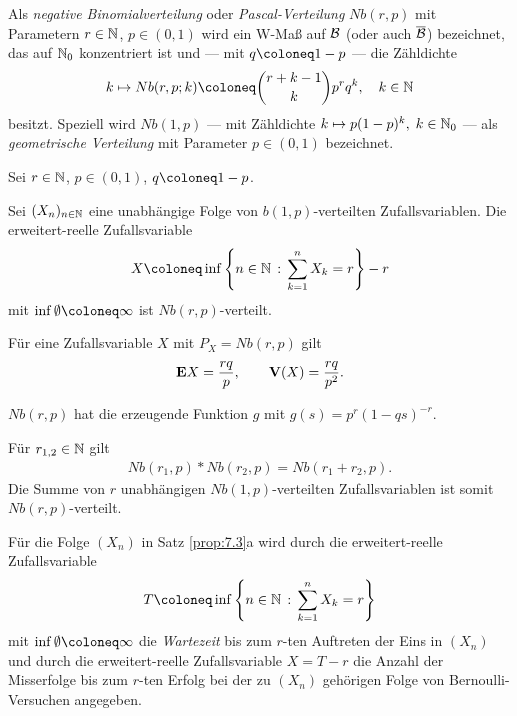 \begin{defn}
\label{defn:7.3}
Als \emph{negative Binomialverteilung} oder \emph{
Pascal-Verteilung} $Nb (r,p)$ mit Parametern $r\in \mathbb{N}$, $p\in (0,1)$
wird ein W-Maß auf ${\mathcal{B}}$ (oder auch $\overline{\mathcal{B}}$) bezeichnet, das
auf $\mathbb{N}_{0}$ konzentriert ist und --- mit $q\defl 1-p$ --- die Zähldichte
\begin{align*}
k\mapsto Nb(r,p;k) \defl {r+k-1\choose k}p^ {r} q^ {k},\quad k\in \N
\end{align*}
besitzt. Speziell wird $Nb (1,p)$ --- mit Zähldichte
$k\mapsto p(1-p)^ {k},\; k\in \mathbb{N}_{0}$ ---
als \emph{geometrische Verteilung} mit Parameter $p\in (0,1)$
bezeichnet.\fishhere
\end{defn} 

\begin{prop}
\label{prop:7.3}
Sei $r \in \mathbb{N}$, $p\in (0,1)$, $q\defl 1-p$.
\begin{propenum}
\item
Sei $(X_{n})_{n\in \mathbb{N}}$ eine unabhängige Folge von $b(1,p)$-verteilten
Zufallsvariablen. Die erweitert-reelle Zufallsvariable
\begin{align*}
X\defl \inf\setdef{n\in \N}{\sum\limits^{n}_{k=1} X_{k}=r}-r
\end{align*}
mit $\inf \emptyset \defl\infty $ ist $Nb(r,p)$-verteilt.
\item
Für eine Zufallsvariable $X$ mit $P_{X} =Nb (r,p)$ gilt
\begin{align*}
\textbf{E} X =\frac{rq}{p},\qquad \textbf{V}(X) = \frac{rq}{p^ {2}}.
\end{align*}
\item
$Nb(r,p)$ hat die erzeugende Funktion $g$ mit $g(s) = p^ {r} (1-qs)^ {-r}$.
\item Für $r_{1,2} \in \mathbb{N}$  gilt
\begin{align*}
Nb(r_{1},p)\ast Nb (r_{2},p) =Nb (r_{1}+r_{2},p).
\end{align*}
Die Summe von $r$  unabhängigen $Nb(1,p)$-verteilten Zufallsvariablen ist somit
$Nb(r,p)$-verteilt.\fishhere
\end{propenum}
\end{prop}

\begin{bem}
\label{bem:7.3}
Für die Folge $(X_{n})$ in Satz \ref{prop:7.3}a wird durch die
erweitert-reelle Zufallsvariable
\begin{align*}
T\defl \inf \setdef{n\in \N}{\sum\limits^ {n}_{k=1} X_{k}=r}
\end{align*}
mit $\inf \emptyset \defl\infty$ die {\it Wartezeit} bis zum $r$-ten
Auftreten der Eins in $(X_{n})$ und durch die erweitert-reelle Zufallsvariable $X=T-r$  die
Anzahl der Misserfolge bis zum $r$-ten Erfolg bei der zu $(X_{n})$ gehörigen
Folge von Bernoulli-Versuchen angegeben.\maphere
\end{bem}

